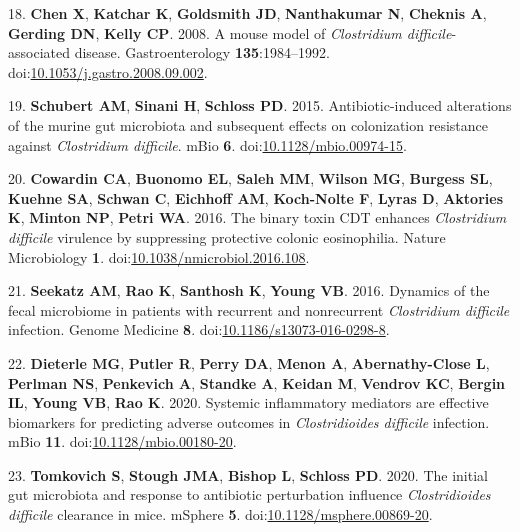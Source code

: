 \documentclass[
  12pt,
]{article}
\newenvironment{cslreferences}%
  {}%
  {\par}
\begin{document}
\begin{cslreferences}
\leavevmode\hypertarget{ref-Chen2008}{}%
18. \textbf{Chen X}, \textbf{Katchar K}, \textbf{Goldsmith JD},
\textbf{Nanthakumar N}, \textbf{Cheknis A}, \textbf{Gerding DN},
\textbf{Kelly CP}. 2008. A mouse model of \emph{Clostridium
difficile}-associated disease. Gastroenterology \textbf{135}:1984--1992.
doi:\href{https://doi.org/10.1053/j.gastro.2008.09.002}{10.1053/j.gastro.2008.09.002}.

\leavevmode\hypertarget{ref-Schubert2015}{}%
19. \textbf{Schubert AM}, \textbf{Sinani H}, \textbf{Schloss PD}. 2015.
Antibiotic-induced alterations of the murine gut microbiota and
subsequent effects on colonization resistance against \emph{Clostridium
difficile}. mBio \textbf{6}.
doi:\href{https://doi.org/10.1128/mbio.00974-15}{10.1128/mbio.00974-15}.

\leavevmode\hypertarget{ref-Cowardin2016}{}%
20. \textbf{Cowardin CA}, \textbf{Buonomo EL}, \textbf{Saleh MM},
\textbf{Wilson MG}, \textbf{Burgess SL}, \textbf{Kuehne SA},
\textbf{Schwan C}, \textbf{Eichhoff AM}, \textbf{Koch-Nolte F},
\textbf{Lyras D}, \textbf{Aktories K}, \textbf{Minton NP}, \textbf{Petri
WA}. 2016. The binary toxin CDT enhances \emph{Clostridium difficile}
virulence by suppressing protective colonic eosinophilia. Nature
Microbiology \textbf{1}.
doi:\href{https://doi.org/10.1038/nmicrobiol.2016.108}{10.1038/nmicrobiol.2016.108}.

\leavevmode\hypertarget{ref-Seekatz2016}{}%
21. \textbf{Seekatz AM}, \textbf{Rao K}, \textbf{Santhosh K},
\textbf{Young VB}. 2016. Dynamics of the fecal microbiome in patients
with recurrent and nonrecurrent \emph{Clostridium difficile} infection.
Genome Medicine \textbf{8}.
doi:\href{https://doi.org/10.1186/s13073-016-0298-8}{10.1186/s13073-016-0298-8}.

\leavevmode\hypertarget{ref-Dieterle2020}{}%
22. \textbf{Dieterle MG}, \textbf{Putler R}, \textbf{Perry DA},
\textbf{Menon A}, \textbf{Abernathy-Close L}, \textbf{Perlman NS},
\textbf{Penkevich A}, \textbf{Standke A}, \textbf{Keidan M},
\textbf{Vendrov KC}, \textbf{Bergin IL}, \textbf{Young VB}, \textbf{Rao
K}. 2020. Systemic inflammatory mediators are effective biomarkers for
predicting adverse outcomes in \emph{Clostridioides difficile}
infection. mBio \textbf{11}.
doi:\href{https://doi.org/10.1128/mbio.00180-20}{10.1128/mbio.00180-20}.

\leavevmode\hypertarget{ref-Tomkovich2020}{}%
23. \textbf{Tomkovich S}, \textbf{Stough JMA}, \textbf{Bishop L},
\textbf{Schloss PD}. 2020. The initial gut microbiota and response to
antibiotic perturbation influence \emph{Clostridioides difficile}
clearance in mice. mSphere \textbf{5}.
doi:\href{https://doi.org/10.1128/msphere.00869-20}{10.1128/msphere.00869-20}.


\end{cslreferences}
\end{document}
